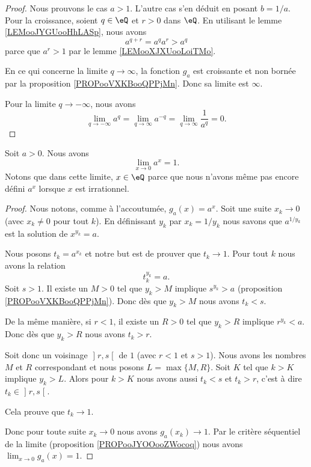 \begin{proof}
    Nous prouvons le cas \( a>1\). L'autre cas s'en déduit en posant \( b=1/a\). Pour la croissance, soient \( q\in \eQ\) et \( r>0\) dans \( \eQ\). En utilisant le lemme \ref{LEMooJYGUooHhLASp}, nous avons
    \begin{equation}
        a^{q+r}=a^qa^r>a^q
    \end{equation}
    parce que \( a^r>1\) par le lemme \ref{LEMooXJXUooLoiTMo}. 

    En ce qui concerne la limite \( q\to \infty\), la fonction \( g_a\) est croissante et non bornée par la proposition \ref{PROPooVXKBooQPPjMn}. Donc sa limite est \( \infty\).

    Pour la limite \( q\to -\infty\), nous avons
    \begin{equation}
        \lim_{q\to -\infty} a^q=\lim_{q\to \infty} a^{-q}=\lim_{q\to \infty} \frac{1}{ a^q }=0.
    \end{equation}
\end{proof}

\begin{proposition}      \label{PROPooIIDGooTRtlUD}
    Soit \( a>0\). Nous avons
    \begin{equation}
        \lim_{x\to 0} a^x=1.
    \end{equation}
    Notons que dans cette limite, \( x\in \eQ\) parce que nous n'avons même pas encore défini \( a^x\) lorsque \( x\) est irrationnel.
\end{proposition}

\begin{proof}
    Nous notons, comme à l'accoutumée, \( g_a(x)=a^x\). Soit une suite \( x_k\to 0\) (avec \( x_k\neq 0\) pour tout \( k\)). En définissant \( y_k\) par \( x_k=1/y_k\) nous savons que \( a^{1/y_k}\) est la solution de \( x^{y_k}=a\).

    Nous posons \( t_k=a^{x_k}\) et notre but est de prouver que \( t_k\to 1\). Pour tout \( k\) nous avons la relation
    \begin{equation}
        t_k^{y_k}=a.
    \end{equation}
    Soit \( s>1\). Il existe un \( M>0\) tel que \( y_k>M\) implique \( s^{y_k}>a\) (proposition \ref{PROPooVXKBooQPPjMn}). Donc dès que \( y_k>M\) nous avons \( t_k<s\).

    De la même manière, si \( r<1\), il existe un \( R>0\) tel que \( y_k>R\) implique \( r^{y_k}<a\). Donc dès que \( y_k>R\) nous avons \( t_k>r\).

    Soit donc un voisinage \( \mathopen] r , s \mathclose[\) de \( 1\) (avec \( r<1\) et \( s>1\)). Nous avons les nombres \( M\) et \( R\) correspondant et nous posons \( L=\max\{ M,R \}\). Soit \( K\) tel que \( k>K\) implique \( y_k>L\). Alors pour \( k>K\) nous avons aussi \( t_k<s\) et \( t_k>r\), c'est à dire \( t_k\in \mathopen] r , s \mathclose[\).

        Cela prouve que \( t_k\to 1\).

        Donc pour toute suite \( x_k\to 0\) nous avons \( g_a(x_k)\to 1\). Par le critère séquentiel de la limite (proposition \ref{PROPooJYOOooZWocoq}) nous avons \( \lim_{x\to 0} g_a(x)=1\).
\end{proof}

